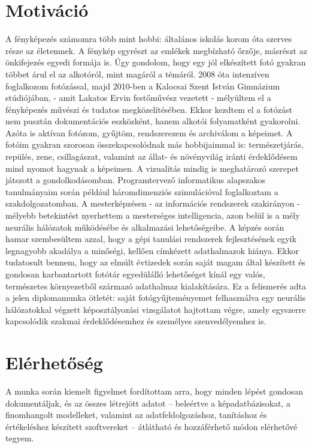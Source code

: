     \section{Motiváció}
        A fényképezés számomra több mint hobbi: általános iskolás korom óta szerves része az életemnek. A fénykép egyrészt az emlékek megbízható őrzője, másrészt az önkifejezés egyedi formája is. Úgy gondolom, hogy egy jól elkészített fotó gyakran többet árul el az alkotóról, mint magáról a témáról. 2008 óta intenzíven foglalkozom fotózással, majd 2010-ben a Kalocsai Szent István Gimnázium stúdiójában, - amit Lakatos Ervin festőművész vezetett - mélyültem el a fényképezés művészi és tudatos megközelítésében. Ekkor kezdtem el a fotózást nem pusztán dokumentációs eszközként, hanem alkotói folyamatként gyakorolni. Azóta is aktívan fotózom, gyűjtöm, rendszerezem és archiválom a képeimet.
        A fotóim gyakran szorosan összekapcsolódnak más hobbijaimmal is: természetjárás, repülés, zene, csillagászat, valamint az állat- és növényvilág iránti érdeklődésem mind nyomot hagynak a képeimen. A vizualitás mindig is meghatározó szerepet játszott a gondolkodásomban. Programtervező informatikus alapszakos tanulmányaim során például háromdimenziós szimulációval foglalkoztam a szakdolgozatomban. A mesterképzésen - az információs rendszerek szakirányon - mélyebb betekintést nyerhettem a mesterséges intelligencia, azon belül is a mély neurális hálózatok működésébe és alkalmazási lehetőségeibe.
        A képzés során hamar szembesültem azzal, hogy a gépi tanulási rendszerek fejlesztésének egyik legnagyobb akadálya a minőségi, kellően címkézett adathalmazok hiánya. Ekkor tudatosult bennem, hogy az elmúlt évtizedek során saját magam által készített és gondosan karbantartott fotótár egyedülálló lehetőséget kínál egy valós, természetes környezetből származó adathalmaz kialakítására. Ez a felismerés adta a jelen diplomamunka ötletét: saját fotógyűjteményemet felhasználva egy neurális hálózatokkal végzett képosztályozási vizsgálatot hajtottam végre, amely egyszerre kapcsolódik szakmai érdeklődésemhez és személyes szenvedélyemhez is.
        \cleardoublepage

        \section{Elérhetőség}

        A munka során kiemelt figyelmet fordítottam arra, hogy minden lépést gondosan dokumentáljak, és az összes létrejött adatot – beleértve a képadatbázisokat, a finomhangolt modelleket, valamint az adatfeldolgozáshoz, tanításhoz és értékeléshez készített szoftvereket – átlátható és hozzáférhető módon elérhetővé tegyem.
        
